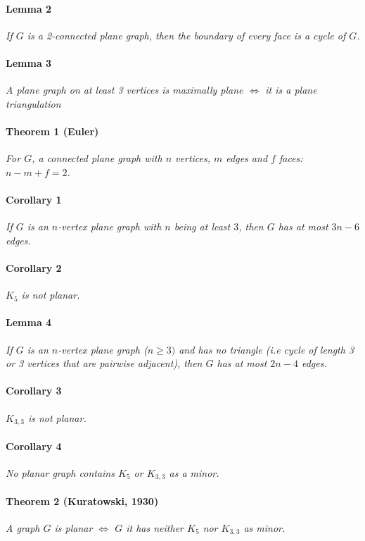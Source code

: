 \documentclass[a4paper,10pt]{article}
\begin{document}
\paragraph{Lemma 2}
\textit{If $G$ is a 2-connected plane graph, then the boundary of every face is a cycle of $G$.}

\paragraph{Lemma 3}
		\textit{A plane graph on at least 3 vertices is maximally plane $\iff$ it is a plane triangulation}
		
\paragraph{Theorem 1 (Euler)}
		\textit{For $G$, a connected plane graph with $n$ vertices, $m$ edges and $f$ faces: $n - m + f = 2$.}
		
\paragraph{Corollary 1} 
\textit{If $G$ is an $n$-vertex plane graph with $n$ being at least $3$, then $G$ has at most $3n - 6$ edges.}

\paragraph{Corollary 2}
\textit{$K_5$ is not planar.}

		
\paragraph{Lemma 4}
\textit{If $G$ is an $n$-vertex plane graph ($n \geq 3)$ and has no triangle (i.e cycle of length 3 or 3 vertices that are pairwise adjacent), then $G$ has at most $2n - 4$ edges.}

\paragraph{Corollary 3}
		\textit{$K_{3,3}$ is not planar.}
		
\paragraph{Corollary 4}
		\textit{No planar graph contains $K_5$ or $K_{3,3}$ as a minor.}
\paragraph{Theorem 2 (Kuratowski, 1930)}
		\textit{A graph $G$ is planar $\iff$ $G$ it has neither $K_5$ nor $K_{3,3}$ as minor.}
\end{document}
